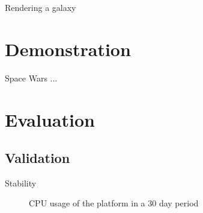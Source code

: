 \documentclass{beamer}
\begin{document}
\begin{frame}{Rendering a galaxy}
\begin{center}
\noindent{}
\end{center}
\end{frame}
\section{Demonstration}
\begin{frame}{Space Wars}
...
\end{frame}
\section{Evaluation}
\subsection{Validation}
\begin{frame}{Stability}
\begin{figure}[H]
\noindent{}
\caption{CPU usage of the platform in a 30 day period}
\end{figure}
\end{frame}
\end{document}
